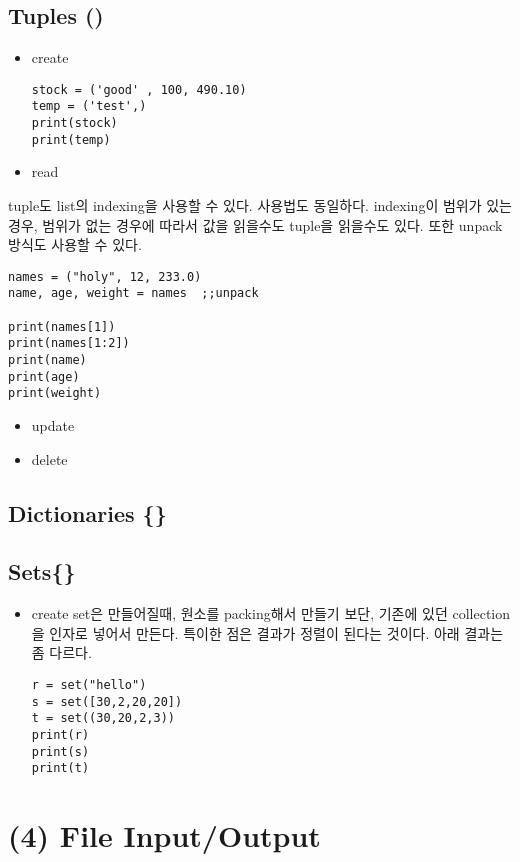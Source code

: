 \documentclass[11pt]{article}
\begin{document}
\subsection{Tuples ()}
\label{sec:orgfd1c02a}
\begin{itemize}
\item create
\begin{verbatim}
stock = ('good' , 100, 490.10)
temp = ('test',)
print(stock)
print(temp)
\end{verbatim}

\item read
\end{itemize}
tuple도 list의 indexing을 사용할 수 있다. 사용법도 동일하다. indexing이 범위가 있는 경우, 범위가 없는 경우에 따라서 값을 읽을수도 tuple을 읽을수도 있다. 또한 unpack방식도 사용할 수 있다.
\begin{verbatim}
names = ("holy", 12, 233.0)
name, age, weight = names  ;;unpack

print(names[1])
print(names[1:2])
print(name)
print(age)
print(weight)
\end{verbatim}

\begin{itemize}
\item update
\item delete
\end{itemize}
\subsection{Dictionaries \{\}}
\label{sec:orga7c392d}
\subsection{Sets\{\}}
\label{sec:orga3611b1}
\begin{itemize}
\item create
set은 만들어질때, 원소를 packing해서 만들기 보단, 기존에 있던 collection을 인자로 넣어서 만든다. 특이한 점은 결과가 정렬이 된다는 것이다. 아래 결과는 좀 다르다. 
\begin{verbatim}
r = set("hello")
s = set([30,2,20,20])
t = set((30,20,2,3))
print(r)
print(s)
print(t)
\end{verbatim}
\end{itemize}

\section{(4) File Input/Output}
\label{sec:org5acf6e7}
\end{document}
